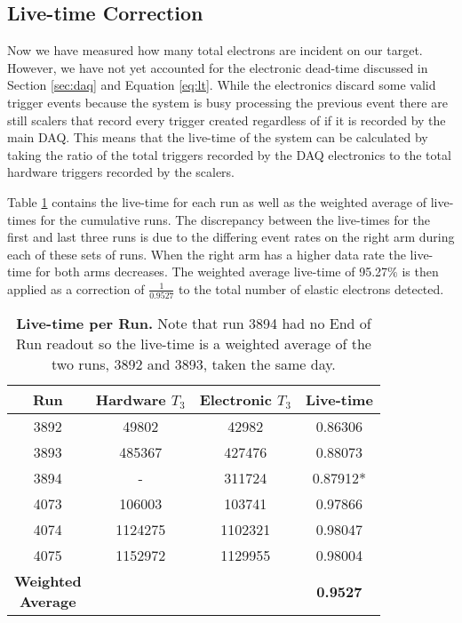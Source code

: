 \subsection{Live-time Correction}
\label{ssec:live-time}

Now we have measured how many total electrons are incident on our target. However, we have not yet accounted for the electronic dead-time discussed in Section \ref{sec:daq} and Equation \ref{eq:lt}. While the electronics discard some valid trigger events because the system is busy processing the previous event there are still scalers that record every trigger created regardless of if it is recorded by the main DAQ. This means that the live-time of the system can be calculated by taking the ratio of the total triggers recorded by the DAQ electronics to the total hardware triggers recorded by the scalers. 

Table \ref{tab:live-time} contains the live-time for each run as well as the weighted average of live-times for the cumulative runs. The discrepancy between the live-times for the first and last three runs is due to the differing event rates on the right arm during each of these sets of runs. When the right arm has a higher data rate the live-time for both arms decreases. The weighted average live-time of 95.27$\%$ is then applied as a correction of $\frac{1}{0.9527}$ to the total number of elastic electrons detected.

\vspace{5mm}

\begin{table}[!h]
\centering
\begin{tabular}{|c c c c|}
\hline
\textbf{Run} & \makecell{\textbf{Hardware}\\ \textbf{$T_3$}} & \makecell{\textbf{Electronic}\\ \textbf{$T_3$}} & \textbf{Live-time}\\
\hline
3892 & 49802 & 42982 & 0.86306 \\
3893 & 485367 & 427476 & 0.88073 \\
3894 & - & 311724 & 0.87912* \\
4073 & 106003 & 103741 & 0.97866 \\
4074 & 1124275 & 1102321 & 0.98047 \\
4075 & 1152972 & 1129955 & 0.98004 \\  
\hline
\makecell{\textbf{Weighted}\\ \textbf{Average}} &  &  & \textbf{0.9527} \\
\hline
\end{tabular}
\caption[Live-time per Run]{{\bf{Live-time per Run.}} Note that run 3894 had no End of Run readout so the live-time is a weighted average of the two runs, 3892 and 3893, taken the same day.}
\label{tab:live-time}
\end{table}

